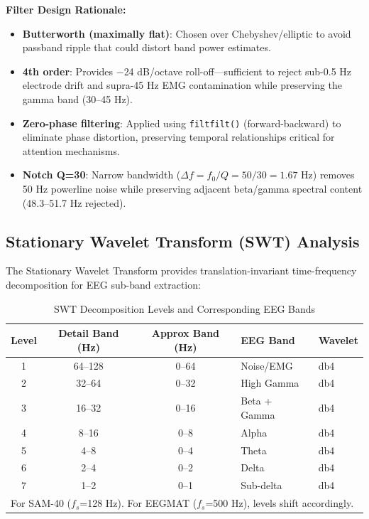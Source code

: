 \documentclass[11pt,a4paper]{article}
\begin{document}
\noindent\textbf{Filter Design Rationale:}
\begin{itemize}[leftmargin=*]
\item \textbf{Butterworth (maximally flat)}: Chosen over Chebyshev/elliptic to avoid passband ripple that could distort band power estimates.
\item \textbf{4th order}: Provides $-$24 dB/octave roll-off---sufficient to reject sub-0.5 Hz electrode drift and supra-45 Hz EMG contamination while preserving the gamma band (30--45 Hz).
\item \textbf{Zero-phase filtering}: Applied using \texttt{filtfilt()} (forward-backward) to eliminate phase distortion, preserving temporal relationships critical for attention mechanisms.
\item \textbf{Notch Q=30}: Narrow bandwidth ($\Delta f = f_0/Q = 50/30 = 1.67$ Hz) removes 50 Hz powerline noise while preserving adjacent beta/gamma spectral content (48.3--51.7 Hz rejected).
\end{itemize}

\subsection{Stationary Wavelet Transform (SWT) Analysis}

The Stationary Wavelet Transform provides translation-invariant time-frequency decomposition for EEG sub-band extraction:

\begin{table}[H]
\centering
\caption{SWT Decomposition Levels and Corresponding EEG Bands}
\small
\begin{tabular}{cccll}
\toprule
\textbf{Level} & \textbf{Detail Band (Hz)} & \textbf{Approx Band (Hz)} & \textbf{EEG Band} & \textbf{Wavelet} \\
\midrule
1 & 64--128 & 0--64 & Noise/EMG & db4 \\
2 & 32--64 & 0--32 & High Gamma & db4 \\
3 & 16--32 & 0--16 & Beta + Gamma & db4 \\
4 & 8--16 & 0--8 & Alpha & db4 \\
5 & 4--8 & 0--4 & Theta & db4 \\
6 & 2--4 & 0--2 & Delta & db4 \\
7 & 1--2 & 0--1 & Sub-delta & db4 \\
\bottomrule
\multicolumn{5}{l}{\small For SAM-40 ($f_s$=128 Hz). For EEGMAT ($f_s$=500 Hz), levels shift accordingly.} \\
\end{tabular}
\end{table}
\end{document}
